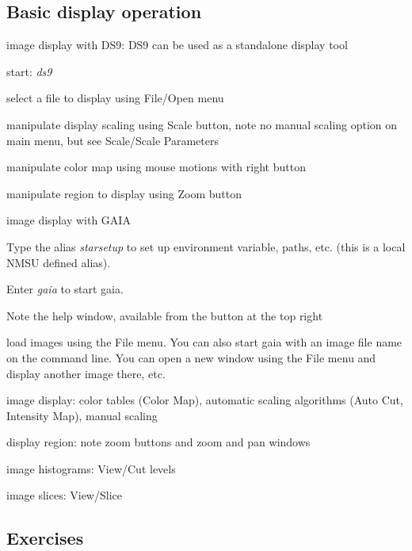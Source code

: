 \documentclass{article}
\begin{document}
\subsection*{Basic display operation}
\begin{itemize*}
    \item image display with DS9: DS9 can be used as a standalone display tool
        \begin{itemize*}
            \item start: \emph{ds9}
            \item select a file to display using File/Open menu
            \item manipulate display scaling using Scale button,
                note no manual scaling option on main menu,
                but see Scale/Scale Parameters
            \item manipulate color map using mouse motions with right button
            \item manipulate region to display using Zoom button
        \end{itemize*}
    \item image display with GAIA
        \begin{itemize*}
            \item Type the alias \emph{starsetup} to set up environment variable,
                paths, etc. (this is a local NMSU defined alias).
            \item Enter \emph{gaia} to start gaia.
            \item Note the help window, available from the button at the
                top right
            \item load images using the File menu. You can also start
                gaia with an image file name on the command line. You can open a new window using the
                File menu and display another image there, etc.
            \item image display: color tables (Color Map), automatic scaling
                algorithms (Auto Cut, Intensity Map), manual scaling
            \item display region: note zoom buttons and zoom and pan windows
            \item image histograms: View/Cut levels
            \item image slices: View/Slice
        \end{itemize*}
\end{itemize*}

\subsection*{Exercises}
\end{document}
